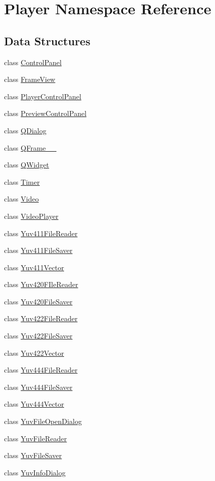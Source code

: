 \hypertarget{namespacePlayer}{}\section{Player Namespace Reference}
\label{namespacePlayer}
\subsection*{Data Structures}
\begin{DoxyCompactItemize}
\item 
class \hyperlink{classPlayer_1_1ControlPanel}{Control\+Panel}
\item 
class \hyperlink{classPlayer_1_1FrameView}{Frame\+View}
\item 
class \hyperlink{classPlayer_1_1PlayerControlPanel}{Player\+Control\+Panel}
\item 
class \hyperlink{classPlayer_1_1PreviewControlPanel}{Preview\+Control\+Panel}
\item 
class \hyperlink{classPlayer_1_1QDialog}{Q\+Dialog}
\item 
class \hyperlink{classPlayer_1_1QFrame____2}{Q\+Frame\+\_\+\+\_}
\item 
class \hyperlink{classPlayer_1_1QWidget}{Q\+Widget}
\item 
class \hyperlink{classPlayer_1_1Timer}{Timer}
\item 
class \hyperlink{classPlayer_1_1Video}{Video}
\item 
class \hyperlink{classPlayer_1_1VideoPlayer}{Video\+Player}
\item 
class \hyperlink{classPlayer_1_1Yuv411FileReader}{Yuv411\+File\+Reader}
\item 
class \hyperlink{classPlayer_1_1Yuv411FileSaver}{Yuv411\+File\+Saver}
\item 
class \hyperlink{classPlayer_1_1Yuv411Vector}{Yuv411\+Vector}
\item 
class \hyperlink{classPlayer_1_1Yuv420FIleReader}{Yuv420\+F\+Ile\+Reader}
\item 
class \hyperlink{classPlayer_1_1Yuv420FileSaver}{Yuv420\+File\+Saver}
\item 
class \hyperlink{classPlayer_1_1Yuv422FileReader}{Yuv422\+File\+Reader}
\item 
class \hyperlink{classPlayer_1_1Yuv422FileSaver}{Yuv422\+File\+Saver}
\item 
class \hyperlink{classPlayer_1_1Yuv422Vector}{Yuv422\+Vector}
\item 
class \hyperlink{classPlayer_1_1Yuv444FileReader}{Yuv444\+File\+Reader}
\item 
class \hyperlink{classPlayer_1_1Yuv444FileSaver}{Yuv444\+File\+Saver}
\item 
class \hyperlink{classPlayer_1_1Yuv444Vector}{Yuv444\+Vector}
\item 
class \hyperlink{classPlayer_1_1YuvFileOpenDialog}{Yuv\+File\+Open\+Dialog}
\item 
class \hyperlink{classPlayer_1_1YuvFileReader}{Yuv\+File\+Reader}
\item 
class \hyperlink{classPlayer_1_1YuvFileSaver}{Yuv\+File\+Saver}
\item 
class \hyperlink{classPlayer_1_1YuvInfoDialog}{Yuv\+Info\+Dialog}
\end{DoxyCompactItemize}
